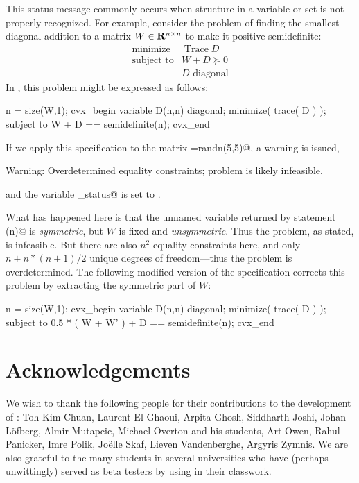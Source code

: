 \documentclass[12pt]{article}
\begin{document}
This status message \verb@Overdetermined@ commonly occurs when structure
in a variable or set is not properly recognized. For example, consider the problem
of finding the smallest diagonal addition to a matrix $W\in\mathbf{R}^{{n}\times{n}}$ to make it positive semidefinite:
\begin{equation}
	\begin{array}{ll}
		\text{minimize} & \mathop{\text{Trace}} D \\
		\text{subject to} & W + D \succeq 0 \\
		                  & D \text{~diagonal}
	\end{array}
\end{equation}
In \cvx, this problem might be expressed as follows:
\begin{code}
	n = size(W,1);
	cvx_begin
	    variable D(n,n) diagonal;
	    minimize( trace( D ) );
	    subject to
	        W + D == semidefinite(n);
	cvx_end
\end{code}
If we apply this specification to the matrix \verb@W=randn(5,5)@, a warning is issued,
\begin{code}
	Warning: Overdetermined equality constraints;
	    problem is likely infeasible.
\end{code}
and the variable \verb@cvx_status@ is set to \verb@Overdetermined@. 

What has happened here
is that the unnamed variable returned by statement \verb@semidefinite(n)@ is \emph{symmetric}, but
$W$ is fixed and \emph{unsymmetric}. Thus the problem, as stated, is infeasible. But
there are also $n^2$ equality constraints here, and only $n+n*(n+1)/2$ unique degrees
of freedom---thus the problem is overdetermined. The following modified 
version of the specification corrects this problem by extracting the symmetric part of $W$:
\begin{code}
	n = size(W,1);
	cvx_begin
	    variable D(n,n) diagonal;
	    minimize( trace( D ) );
	    subject to
	        0.5 * ( W + W' ) + D == semidefinite(n);
	cvx_end
\end{code}

\section{Acknowledgements}

We wish to thank the following people for their contributions to
the development of \cvx: Toh Kim Chuan, Laurent El Ghaoui, Arpita Ghosh, 
Siddharth Joshi, Johan L\"{o}fberg, Almir Mutapcic, Michael Overton
and his students, Art Owen, Rahul Panicker, Imre Polik, Jo\"{e}lle Skaf, 
Lieven Vandenberghe, Argyris Zymnis. We are also grateful to the many
students in several universities who have (perhaps unwittingly)
served as beta testers by using \cvx in their classwork.

\newpage

\newpage
\printindex
\end{document}
